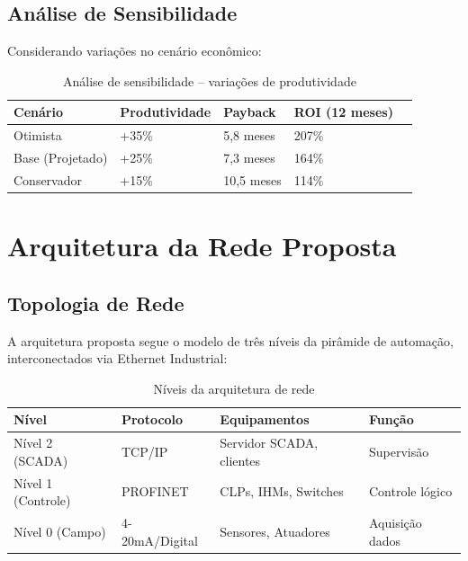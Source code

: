 \documentclass[12pt,a4paper]{article}
\begin{document}
\subsection{Análise de Sensibilidade}

Considerando variações no cenário econômico:

\begin{table}[h]
\centering
\begin{tabular}{@{}p{4cm}|p{3cm}|p{3cm}|p{3cm}|p{3cm}@{}}
\toprule
\textbf{Cenário} & \textbf{Produtividade} & \textbf{Payback} & \textbf{ROI (12 meses)} \\
\midrule
Otimista & +35\% & 5,8 meses & 207\% \\
\midrule
Base (Projetado) & +25\% & 7,3 meses & 164\% \\
\midrule
Conservador & +15\% & 10,5 meses & 114\% \\
\bottomrule
\end{tabular}
\caption{Análise de sensibilidade -- variações de produtividade}
\end{table}

\section{Arquitetura da Rede Proposta}

\subsection{Topologia de Rede}

A arquitetura proposta segue o modelo de três níveis da pirâmide de automação, interconectados via Ethernet Industrial:

\begin{table}[h]
\centering
\begin{tabular}{@{}p{3cm}|p{4cm}|p{3cm}|p{5cm}@{}}
\toprule
\textbf{Nível} & \textbf{Protocolo} & \textbf{Equipamentos} & \textbf{Função} \\
\midrule
Nível 2 (SCADA) & TCP/IP & Servidor SCADA, clientes & Supervisão \\
\midrule
Nível 1 (Controle) & PROFINET & CLPs, IHMs, Switches & Controle lógico \\
\midrule
Nível 0 (Campo) & 4-20mA/Digital & Sensores, Atuadores & Aquisição dados \\
\bottomrule
\end{tabular}
\caption{Níveis da arquitetura de rede}
\end{table}
\end{document}

